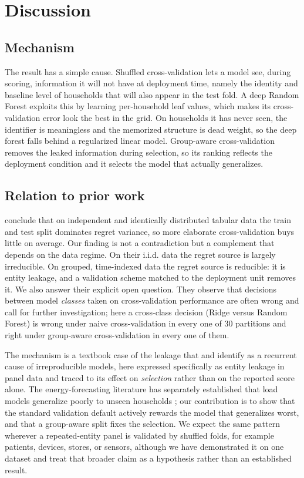 \documentclass[10pt]{article}
\begin{document}
\section{Discussion}

\subsection{Mechanism}

The result has a simple cause. Shuffled cross-validation lets a model see, during
scoring, information it will not have at deployment time, namely the identity and
baseline level of households that will also appear in the test fold. A deep
Random Forest exploits this by learning per-household leaf values, which makes its
cross-validation error look the best in the grid. On households it has never seen,
the identifier is meaningless and the memorized structure is dead weight, so the
deep forest falls behind a regularized linear model. Group-aware cross-validation
removes the leaked information during selection, so its ranking reflects the
deployment condition and it selects the model that actually generalizes.

\subsection{Relation to prior work}

\citet{teodorescu2025regret} conclude that on independent and identically
distributed tabular data the train and test split dominates regret variance, so
more elaborate cross-validation buys little on average. Our finding is not a
contradiction but a complement that depends on the data regime. On their i.i.d.
data the regret source is largely irreducible. On grouped, time-indexed data the
regret source is reducible: it is entity leakage, and a validation scheme matched
to the deployment unit removes it. We also answer their explicit open question.
They observe that decisions between model \emph{classes} taken on
cross-validation performance are often wrong and call for further investigation;
here a cross-class decision (Ridge versus Random Forest) is wrong under naive
cross-validation in every one of 30 partitions and right under group-aware
cross-validation in every one of them.

The mechanism is a textbook case of the leakage that \citet{kapoor2023leakage}
and \citet{roberts2021pitfalls} identify as a recurrent cause of irreproducible
models, here expressed specifically as entity leakage in panel data and traced to
its effect on \emph{selection} rather than on the reported score alone. The
energy-forecasting literature has separately established that load models
generalize poorly to unseen households \citep{pirbazari2020generalization}; our
contribution is to show that the standard validation default actively rewards the
model that generalizes worst, and that a group-aware split fixes the selection.
We expect the same pattern wherever a repeated-entity panel is validated by
shuffled folds, for example patients, devices, stores, or sensors, although we
have demonstrated it on one dataset and treat that broader claim as a hypothesis
rather than an established result.
\end{document}
